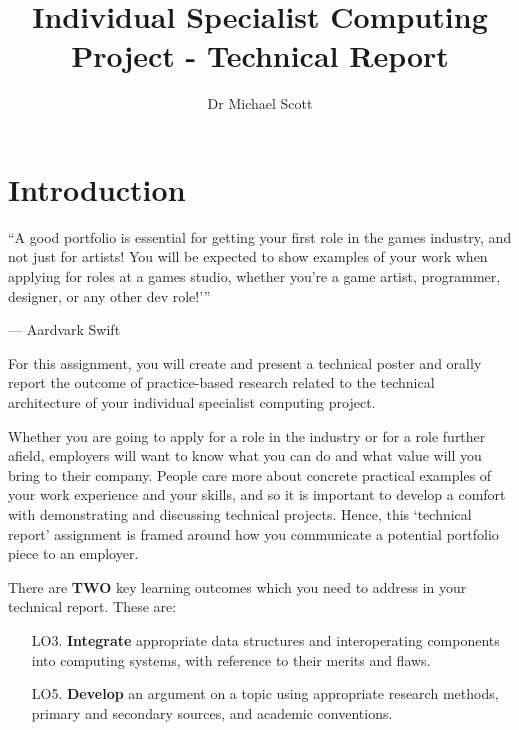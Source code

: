 \documentclass{../../fal_assignment}
\title{Individual Specialist Computing Project - Technical Report}
\author{Dr Michael Scott}
\begin{document}
\maketitle

\section*{Introduction}

\begin{marginquote}
``A good portfolio is essential for getting your first role in the games industry, and not just for artists! You will be expected to show examples of your work when applying for roles at a games studio, whether you’re a game artist, programmer, designer, or any other dev role!'\thinspace''

--- Aardvark Swift
\end{marginquote}

For this assignment, you will create and present a technical poster and orally report the outcome of practice-based research related to the technical architecture of your individual specialist computing project.

Whether you are going to apply for a role in the industry or for a role further afield, employers will want to know what you can do and what value will you bring
to their company. People care more about concrete practical examples of your work experience and your skills, and so it is important to develop a comfort with demonstrating
and discussing technical projects. Hence, this `technical report' assignment is framed around how you communicate a potential portfolio piece to an employer.
 
There are \textbf{TWO} key learning outcomes which you need to address in your technical report. These are:

\begin{itemize}
	\setlength{\itemindent}{1em}
	\item[LO3. ] \textbf{Integrate} appropriate data structures and interoperating components into computing systems, with reference to their merits and flaws.
	\item[LO5. ] \textbf{Develop} an argument on a topic using appropriate research methods, primary and secondary sources, and academic conventions.
\end{itemize}
\end{document}
